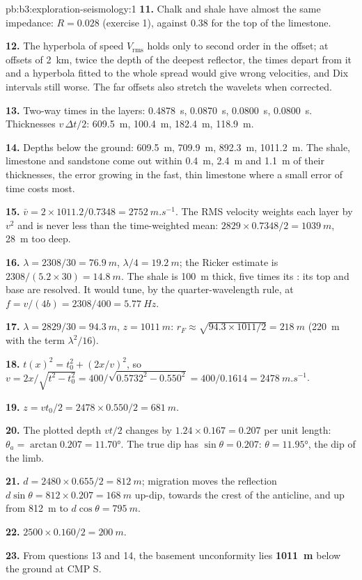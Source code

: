 \begin{solution}{pb:b3:exploration-seismology:1}
\textbf{11.} Chalk and shale have almost the same impedance: $R = 0.028$
(exercise 1), against 0.38 for the top of the limestone.

\textbf{12.} The hyperbola of speed $V_{\text{rms}}$ holds only to second order
in the offset; at offsets of \qty{2}{km}, twice the depth of the deepest
reflector, the times depart from it and a hyperbola fitted to the whole spread
would give wrong velocities, and Dix intervals still worse. The far offsets
also stretch the wavelets when corrected.

\textbf{13.} Two-way times in the layers: \qty{0.4878}{s}, \qty{0.0870}{s},
\qty{0.0800}{s}, \qty{0.0800}{s}. Thicknesses $v\,\Delta t/2$: \qty{609.5}{m},
\qty{100.4}{m}, \qty{182.4}{m}, \qty{118.9}{m}.

\textbf{14.} Depths below the ground: \qty{609.5}{m}, \qty{709.9}{m},
\qty{892.3}{m}, \qty{1011.2}{m}. The shale, limestone and sandstone come out
within \qty{0.4}{m}, \qty{2.4}{m} and \qty{1.1}{m} of their thicknesses, the
error growing in the fast, thin limestone where a small error of time costs
most.

\textbf{15.} $\bar v = 2\times1011.2/0.7348 = \qty{2752}{m.s^{-1}}$. The RMS
velocity weights each layer by $v^2$ and is never less than the time-weighted
mean: $2829\times0.7348/2 = \qty{1039}{m}$, \qty{28}{m} too deep.

\textbf{16.} $\lambda = 2308/30 = \qty{76.9}{m}$, $\lambda/4 = \qty{19.2}{m}$;
the Ricker estimate is $2308/(5.2\times30) = \qty{14.8}{m}$. The shale is
\qty{100}{m} thick, five times its : its top and base are
resolved. It would tune, by the quarter-wavelength rule, at $f = v/(4b) =
2308/400 = \qty{5.77}{Hz}$.

\textbf{17.} $\lambda = 2829/30 = \qty{94.3}{m}$, $z = \qty{1011}{m}$:
$r_F \approx \sqrt{94.3\times1011/2} = \qty{218}{m}$ (\qty{220}{m} with the
term $\lambda^2/16$).

\textbf{18.} $t(x)^2 = t_0^2 + (2x/v)^2$, so $v = 2x/\sqrt{t^2 - t_0^2} =
400/\sqrt{0.5732^2 - 0.550^2} = 400/0.1614 = \qty{2478}{m.s^{-1}}$.

\textbf{19.} $z = vt_0/2 = 2478\times0.550/2 = \qty{681}{m}$.

\textbf{20.} The plotted depth $vt/2$ changes by $1.24\times0.167 = 0.207$ per
unit length: $\theta_a = \arctan0.207 = \ang{11.70}$. The true dip has
$\sin\theta = 0.207$: $\theta = \ang{11.95}$, the dip of the limb.

\textbf{21.} $d = 2480\times0.655/2 = \qty{812}{m}$; migration moves the
reflection $d\sin\theta = 812\times0.207 = \qty{168}{m}$ up-dip, towards the
crest of the anticline, and up from \qty{812}{m} to $d\cos\theta =
\qty{795}{m}$.

\textbf{22.} $2500\times0.160/2 = \qty{200}{m}$.

\textbf{23.} From questions 13 and 14, the basement unconformity lies
\textbf{\qty[text-series-to-math=true]{1011}{m}} below the ground at CMP S.
\end{solution}
